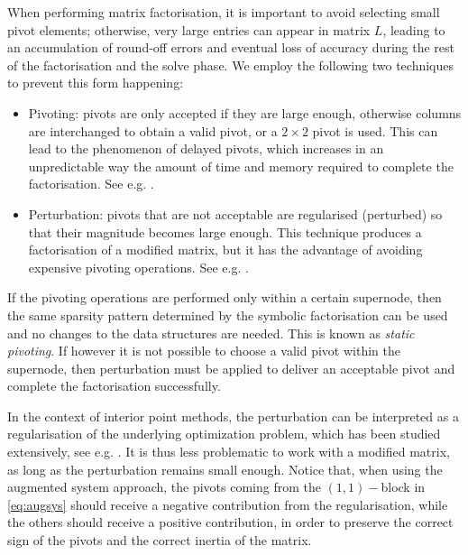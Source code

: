 \documentclass[a4paper]{article}
\newcommand{\0}{\mathbf 0}
\begin{document}
When performing matrix factorisation, it is important to avoid selecting small pivot elements; otherwise, very large entries can appear in matrix $L$, leading to an accumulation of round-off errors and eventual loss of accuracy during the rest of the factorisation and the solve phase. We employ the following two techniques to prevent this form happening:
\begin{itemize}
\item Pivoting: pivots are only accepted if they are large enough, otherwise columns are interchanged to obtain a valid pivot, or a $2\times2$ pivot is used. This can lead to the phenomenon of delayed pivots, which increases in an unpredictable way the amount of time and memory required to complete the factorisation. See e.g. \cite{AshGriLew:pivoting}.
\item Perturbation: pivots that are not acceptable are regularised (perturbed) so that their magnitude becomes large enough. This technique produces a factorisation of a modified matrix, but it has the advantage of avoiding expensive pivoting operations. See e.g. \cite{AltGon:regularization}.
\end{itemize}

If the pivoting operations are performed only within a certain supernode, then the same sparsity pattern determined by the symbolic factorisation can be used and no changes to the data structures are needed. This is known as {\it static pivoting}. If however it is not possible to choose a valid pivot within the supernode, then perturbation must be applied to deliver an acceptable pivot and complete the factorisation successfully.

In the context of interior point methods, the perturbation can be interpreted as a regularisation of the underlying optimization problem, which has been studied extensively, see e.g. \cite{AltGon:regularization,CipGon:psipm,FriOrb:regularization}. It is thus less problematic to work with a modified matrix, as long as the perturbation remains small enough. Notice that, when using the augmented system approach, the pivots coming from the $(1,1)-$block in \eqref{eq:augsys} should receive a negative contribution from the regularisation, while the others should receive a positive contribution, in order to preserve the correct sign of the pivots and the correct inertia of the matrix. 
\end{document}

